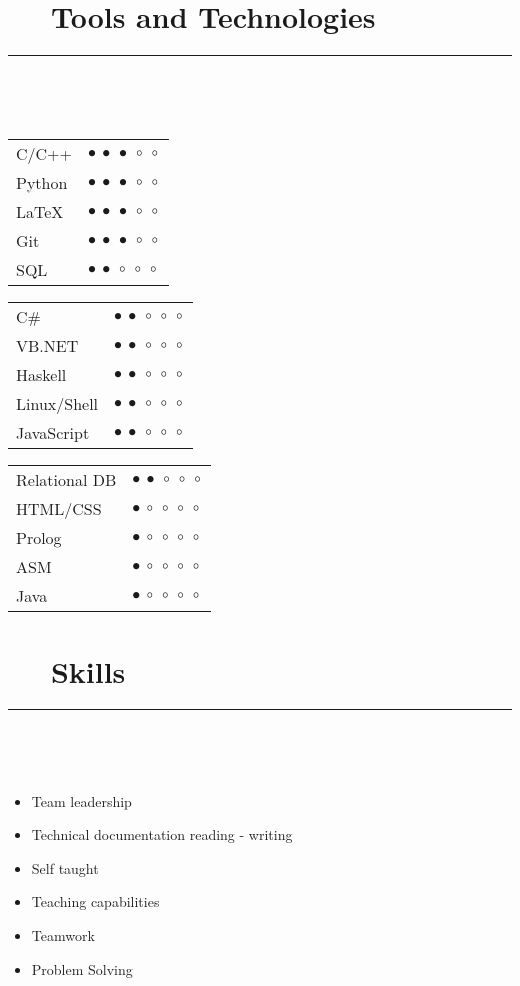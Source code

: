 \documentclass{article}
\begin{document}
\section*{\faCogs ~~ Tools and Technologies} 
\hrule
\

\
    
\begin{multicols}{3}
    \begin{tabular}{l l}
        C/C++ & $\bullet~\bullet~\bullet~\circ~\circ$ \\
        Python & $\bullet~\bullet~\bullet~\circ~\circ$ \\
        LaTeX & $\bullet~\bullet~\bullet~\circ~\circ$ \\
        Git & $\bullet~\bullet~\bullet~\circ~\circ$ \\
        SQL & $\bullet~\bullet~\circ~\circ~\circ$
    \end{tabular}
    
    \begin{tabular}{l l}
        C\# & $\bullet~\bullet~\circ~\circ~\circ$ \\
        VB.NET & $\bullet~\bullet~\circ~\circ~\circ$ \\
        Haskell & $\bullet~\bullet~\circ~\circ~\circ$ \\
        Linux/Shell & $\bullet~\bullet~\circ~\circ~\circ$ \\
        JavaScript & $\bullet~\bullet~\circ~\circ~\circ$
    \end{tabular}
    
    \begin{tabular}{l l}
        Relational DB & $\bullet~\bullet~\circ~\circ~\circ$ \\
        HTML/CSS & $\bullet~\circ~\circ~\circ~\circ$ \\
        Prolog & $\bullet~\circ~\circ~\circ~\circ$ \\
        ASM & $\bullet~\circ~\circ~\circ~\circ$ \\
        Java & $\bullet~\circ~\circ~\circ~\circ$
    \end{tabular} 
\end{multicols}

\newpage

\section*{\faCoffee ~~ Skills} 
\hrule
\

\

\begin{multicols}{2}
    \begin{itemize}
        \item Team leadership
        \item Technical documentation reading - writing
        \item Self taught
        \item Teaching capabilities
        \item Teamwork
        \item Problem Solving
    \end{itemize}
\end{multicols}
\end{document}
